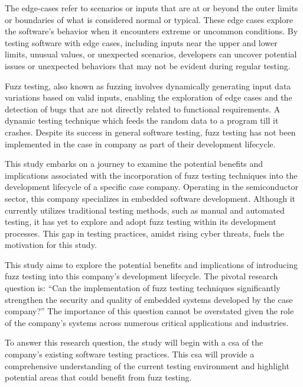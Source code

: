 The \gls{edge-cases} refer to scenarios or inputs that are at or beyond the outer limits or boundaries
of what is considered normal or typical. These edge cases explore the software's behavior when
it encounters extreme or uncommon conditions. By testing software with edge cases, including
inputs near the upper and lower limits, unusual values, or unexpected scenarios, developers
can uncover potential issues or unexpected behaviors that may not be evident
during regular testing\cite{deng2023large}\cite{cunningham2019software}\cite{koopman2016challenges}.


Fuzz testing, also known as fuzzing involves dynamically generating input data variations
based on valid inputs, enabling the exploration of edge cases and the detection of bugs that are not directly
related to functional requirements\cite{9787842}\cite{fowler2018fuzz}\cite{deng2023large}\cite{eisele2022embedded}.
A dynamic testing technique which feeds the random data to a program till it crashes\cite{felderer2016security}\cite{yun2022fuzzing}.
Despite its success in general software testing, fuzz testing has not been implemented in the case
in company as part of their development lifecycle.

This study embarks on a journey to examine the potential benefits and implications
associated with the incorporation of fuzz testing techniques into the development
lifecycle of a specific case company. Operating in the semiconductor sector,
this company specializes in embedded software development. Although it currently
utilizes traditional testing methods, such as manual and automated testing, it
has yet to explore and adopt fuzz testing within its development processes.
This gap in testing practices, amidst rising cyber threats, fuels the motivation
for this study.

This study aims to explore the potential benefits and implications of introducing
fuzz testing into this company's development lifecycle. The pivotal research
question is: ``Can the implementation of fuzz testing techniques significantly
strengthen the security and quality of embedded systems developed by the case
company?'' The importance of this question cannot be overstated given the
role of the company's systems across numerous critical applications and industries.

To answer this research question, the study will begin with a \gls{csa} of
the company's existing software testing practices. This \acrshort{csa} will provide a
comprehensive understanding of the current testing environment and highlight
potential areas that could benefit from fuzz testing.

